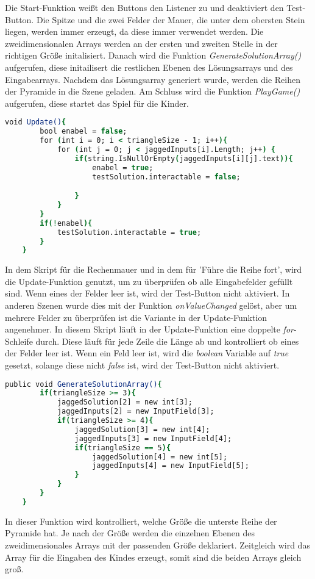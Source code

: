 Die Start-Funktion weißt den Buttons den Listener zu und deaktiviert den Test-Button. Die Spitze und die zwei Felder der Mauer, die unter dem obersten Stein liegen, werden immer erzeugt, da diese immer verwendet werden. Die zweidimensionalen Arrays werden an der ersten und zweiten Stelle in der richtigen Größe initalisiert. Danach wird die Funktion \textit{GenerateSolutionArray()} aufgerufen, diese initailisert die restlichen Ebenen des Lösungsarrays und des Eingabearrays. Nachdem das Lösungsarray generiert wurde, werden die Reihen der Pyramide in die Szene geladen. Am Schluss wird die Funktion \textit{PlayGame()} aufgerufen, diese startet das Spiel für die Kinder.\\
\begin{lstlisting}[language=csh, caption={Triangle.cs Update-Funktion}]
	void Update(){
		bool enabel = false;
		for (int i = 0; i < triangleSize - 1; i++){
			for (int j = 0; j < jaggedInputs[i].Length; j++) {
				if(string.IsNullOrEmpty(jaggedInputs[i][j].text)){
					enabel = true;
					testSolution.interactable = false;

				}
			}
		}
		if(!enabel){
			testSolution.interactable = true;
		}
	}
\end{lstlisting}
In dem Skript für die Rechenmauer und in dem für 'Führe die Reihe fort', wird die Update-Funktion genutzt, um zu überprüfen ob alle Eingabefelder gefüllt sind. Wenn eines der Felder leer ist, wird der Test-Button nicht aktiviert. In anderen Szenen wurde dies mit der Funktion \textit{onValueChanged} gelöst, aber um mehrere Felder zu überprüfen ist die Variante in der Update-Funktion angenehmer. In diesem Skript läuft in der Update-Funktion eine doppelte \textit{for}-Schleife durch. Diese läuft für jede Zeile die Länge ab und kontrolliert ob eines der Felder leer ist. Wenn ein Feld leer ist, wird die \textit{boolean} Variable auf \textit{true} gesetzt, solange diese nicht \textit{false} ist, wird der Test-Button nicht aktiviert.\\
\begin{lstlisting}[language=csh, caption={Triangle.cs GenerateSolutionArray-Funktion}]
	public void GenerateSolutionArray(){
		if(triangleSize >= 3){
			jaggedSolution[2] = new int[3];
			jaggedInputs[2] = new InputField[3];
			if(triangleSize >= 4){
				jaggedSolution[3] = new int[4];
				jaggedInputs[3] = new InputField[4];
				if(triangleSize == 5){
					jaggedSolution[4] = new int[5];
					jaggedInputs[4] = new InputField[5];
				}
			}
		}
	}
\end{lstlisting}
In dieser Funktion wird kontrolliert, welche Größe die unterste Reihe der Pyramide hat. Je nach der Größe werden die einzelnen Ebenen des zweidimensionales Arrays mit der passenden Größe deklariert. Zeitgleich wird das Array für die Eingaben des Kindes erzeugt, somit sind die beiden Arrays gleich groß.\\
